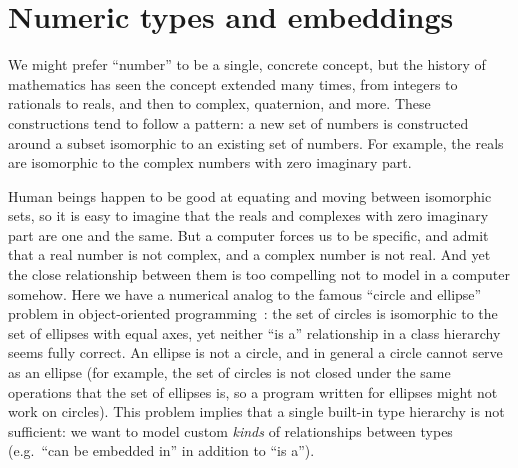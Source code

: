 

\section{Numeric types and embeddings}

We might prefer ``number'' to be a single, concrete concept, but the history of
mathematics has seen the concept extended many times, from integers to rationals to
reals, and then to complex, quaternion, and more.
These constructions tend to follow a pattern: a new set of numbers is constructed
around a subset isomorphic to an existing set of numbers.
For example, the reals are isomorphic to the complex numbers with zero imaginary part.

Human beings happen to be good at equating and moving between isomorphic sets,
so it is easy to imagine that the reals and complexes with zero imaginary
part are one and the same.
But a computer forces us to be specific, and admit
that a real number is not complex, and a complex number is not real.
And yet the close relationship between them is too compelling not to model in a
computer somehow.
Here we have a numerical analog to the famous ``circle and ellipse'' problem in
object-oriented programming~\cite{cline1995c++}: the set of circles is
isomorphic to the set of ellipses with equal axes, yet neither ``is a''
relationship in a class hierarchy seems fully correct.
An ellipse is not a circle, and in general a circle cannot serve as an ellipse
(for example, the set of circles is not closed under the same operations that the
set of ellipses is, so a program written for ellipses might not work on circles).
This problem implies that a single built-in type hierarchy is not
sufficient: we want to model custom \emph{kinds} of relationships between
types (e.g.\ ``can be embedded in'' in addition to ``is a'').


